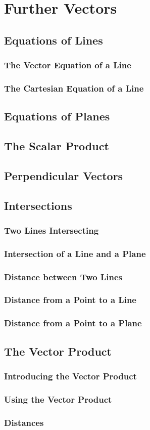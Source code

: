 \documentclass[../maths.tex]{subfiles}
\begin{document}
\chapter{Further Vectors}
\section{Equations of Lines}
\subsection*{The Vector Equation of a Line}
\subsection*{The Cartesian Equation of a Line}
\section{Equations of Planes}
\section{The Scalar Product}
\section{Perpendicular Vectors}
\section{Intersections}
\subsection*{Two Lines Intersecting}
\subsection*{Intersection of a Line and a Plane}
\subsection*{Distance between Two Lines}
\subsection*{Distance from a Point to a Line}
\subsection*{Distance from a Point to a Plane}
\section{The Vector Product}
\subsection*{Introducing the Vector Product}
\subsection*{Using the Vector Product}
\subsection*{Distances}
\end{document}
